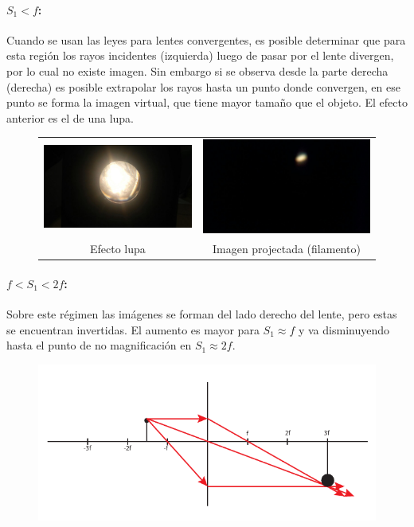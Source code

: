 \documentclass[addpoints,10pt]{exam}
\begin{document}
\begin{questions}
		\paragraph{$S_1 < f$:}
			Cuando se usan las leyes para lentes convergentes, es posible determinar que para esta regi\'on los rayos incidentes (izquierda) luego de pasar por el lente divergen, por lo cual no existe imagen. Sin embargo si se observa desde la parte derecha (derecha) es posible extrapolar los rayos hasta un punto donde convergen, en ese punto se forma la imagen virtual, que tiene mayor tama\~no que el objeto. El efecto anterior es el de una lupa.
			\begin{figure}[h]
				\centering
				\begin{tabular}{cc}
					\includegraphics[width = 0.4\linewidth]{lupa.jpeg} & \includegraphics[width = 0.4\linewidth]{bombillo.jpeg} \\
					Efecto lupa & Imagen projectada (filamento)
				\end{tabular}
				
			\end{figure}
			
		\paragraph{$f < S_1 < 2f$:} 
			Sobre este r\'egimen las im\'agenes se forman del lado derecho del lente, pero estas se encuentran invertidas. El aumento es mayor para $S_1 \approx f$ y va disminuyendo hasta el punto de no magnificaci\'on en $S_1 \approx 2f$. 
			\begin{figure}[h]
				\centering
				\includegraphics[width = 0.8\linewidth]{magnification.pdf}
			\end{figure}
			

\end{questions}
\end{document}

